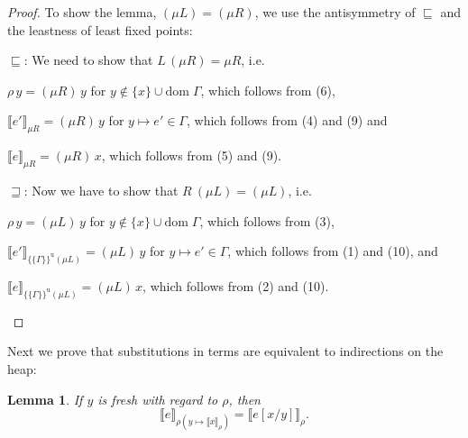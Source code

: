\documentclass{jfp1}
\newtheorem{lemma}{Lemma}
\theoremstyle{nonumberbreak}
\newtheorem{proof}{Proof}
\newcommand{\dom}[1]{\text{dom}\;#1}
\newcommand{\dsem}[2]{\llbracket #1 \rrbracket_{#2}}
\newcommand{\esemu}[1]{\{\!\!\!\{#1\}\!\!\!\}^{\text{u}}}
\begin{document}
\begin{proof}
To show the lemma, $(\mu L) = (\mu R)$, we use the antisymmetry of $\sqsubseteq$ and the leastness of least fixed points:
\begin{compactitem}[$\sqsubseteq$:]
\item[$\sqsubseteq$:] We need to show that $L\, (\mu R) = \mu R$, i.e.
\begin{compactitem}
\item $\rho\,y = (\mu R)\, y$ for $y \notin \{x\}\cup \dom\Gamma$, which follows from (6),
\item $\dsem{e'}{\mu R} = (\mu R)\, y$ for $y \mapsto e' \in \Gamma$, which follows from (4) and (9) and
\item $\dsem{e}{\mu R} = (\mu R)\, x$, which follows from (5) and (9).
\end{compactitem}
\item[$\sqsupseteq$:] Now we have to show that $R\ (\mu L) = (\mu L)$, i.e.
\begin{compactitem}
\item $\rho\,y = (\mu L)\, y$ for $y \notin \{x\}\cup \dom\Gamma$, which follows from (3),
\item $\dsem{e'}{\esemu{\Gamma}{(\mu L)}} = (\mu L)\, y$ for $y \mapsto e' \in \Gamma$, which follows from (1) and (10), and
\item $\dsem{e}{\esemu{\Gamma}{(\mu L)}} = (\mu L)\, x$, which follows from (2) and (10).
\end{compactitem}
\end{compactitem}
\end{proof}

Next we prove that substitutions in terms are equivalent to indirections on the heap:

\begin{lemma}
If $y$ is fresh with regard to $\rho$, then
\label{lem:subst}
\[
\dsem{e}{\rho (y \mapsto \dsem{x}\rho)} = \dsem{ e[x/y]}{\rho}.
\]
\end{lemma}
\end{document}
